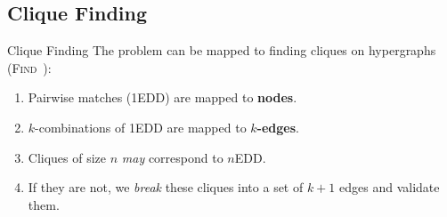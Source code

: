 \documentclass[10pt]{beamer}
\begin{document}
\subsection{Clique Finding}
\begin{frame}{Clique Finding}
    The problem can be mapped to finding cliques on hypergraphs (\textsc{Find}~\cite{koeller2003discovery}):
    
    \begin{enumerate}
        \item Pairwise matches (1EDD) are mapped to \textbf{nodes}.
        \item $k$-combinations of 1EDD are mapped to \textbf{$k$-edges}.
        \item Cliques of size $n$ \emph{may} correspond to $n$EDD.
        \item If they are not, we \emph{break} these cliques into a set of $k+1$ edges and
            validate them.
    \end{enumerate}
\end{frame}
\end{document}
